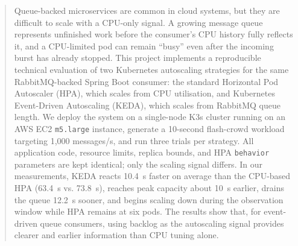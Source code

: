 \begin{abstract}
Queue-backed microservices are common in cloud systems, but they are difficult to scale with a CPU-only signal. A growing message queue represents unfinished work before the consumer's CPU history fully reflects it, and a CPU-limited pod can remain ``busy'' even after the incoming burst has already stopped. This project implements a reproducible technical evaluation of two Kubernetes autoscaling strategies for the same RabbitMQ-backed Spring Boot consumer: the standard Horizontal Pod Autoscaler (HPA), which scales from CPU utilisation, and Kubernetes Event-Driven Autoscaling (KEDA), which scales from RabbitMQ queue length. We deploy the system on a single-node K3s cluster running on an AWS EC2 \texttt{m5.large} instance, generate a 10-second flash-crowd workload targeting 1,000 messages/s, and run three trials per strategy. All application code, resource limits, replica bounds, and HPA \texttt{behavior} parameters are kept identical; only the scaling signal differs. In our measurements, KEDA reacts 10.4~s faster on average than the CPU-based HPA (63.4~s vs. 73.8~s), reaches peak capacity about 10~s earlier, drains the queue 12.2~s sooner, and begins scaling down during the observation window while HPA remains at six pods. The results show that, for event-driven queue consumers, using backlog as the autoscaling signal provides clearer and earlier information than CPU tuning alone.
\end{abstract}
